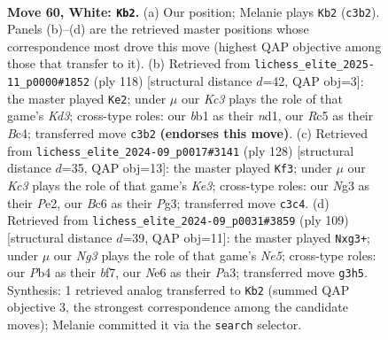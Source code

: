 \documentclass[11pt]{article}
\begin{document}
\clearpage

\begin{figure}[p]\centering
\begin{subfigure}{0.46\textwidth}\centering
\resizebox{\linewidth}{!}{%
\newchessgame
\chessboard[
  setfen={8/k3r3/2B1N3/2R2p2/1P6/2K3N1/6P1/1b6 w - - 16 60},
  showmover=false,
  pgfstyle=straightmove, color=movearrow, markmove={c3-b2}
]}
\caption{}
\end{subfigure}\hfill
\begin{subfigure}{0.46\textwidth}\centering
\resizebox{\linewidth}{!}{%
\newchessgame
\chessboard[
  setfen={8/4kp2/8/5p1R/2BP1P1P/3K1r2/8/3n4 w - - 0 60},
  showmover=false,
  pgfstyle=straightmove, color=movearrow, markmove={d3-e2}
]}
\caption{}
\end{subfigure}
\\[4pt]
\begin{subfigure}{0.46\textwidth}\centering
\resizebox{\linewidth}{!}{%
\newchessgame
\chessboard[
  setfen={8/6k1/2p1R2p/8/2r2N2/4K1P1/4P2P/1b6 w - - 28 65},
  showmover=false,
  pgfstyle=straightmove, color=movearrow, markmove={e3-f3}
]}
\caption{}
\end{subfigure}\hfill
\begin{subfigure}{0.46\textwidth}\centering
\resizebox{\linewidth}{!}{%
\newchessgame
\chessboard[
  setfen={8/5B2/8/4k3/R3n2P/p1r3P1/4K3/8 b - - 10 55},
  showmover=false,
  pgfstyle=straightmove, color=movearrow, markmove={e4-g3}
]}
\caption{}
\end{subfigure}
\caption{\textbf{Move 60, White: \texttt{Kb2}.} (a) Our position; Melanie plays \texttt{Kb2} (\texttt{c3b2}). Panels (b)--(d) are the retrieved master positions whose correspondence most drove this move (highest QAP objective among those that transfer to it). (b) Retrieved from \texttt{lichess\_elite\_2025-11\_p0000\#1852} (ply 118) [structural distance $d$=42, QAP obj=3]: the master played \texttt{Ke2}; under $\mu$ our \emph{Kc3} plays the role of that game's \emph{Kd3}; cross-type roles: our \emph{b}b1 as their \emph{n}d1, our \emph{R}c5 as their \emph{B}c4; transferred move \texttt{c3b2} \textbf{(endorses this move)}. (c) Retrieved from \texttt{lichess\_elite\_2024-09\_p0017\#3141} (ply 128) [structural distance $d$=35, QAP obj=13]: the master played \texttt{Kf3}; under $\mu$ our \emph{Kc3} plays the role of that game's \emph{Ke3}; cross-type roles: our \emph{N}g3 as their \emph{P}e2, our \emph{B}c6 as their \emph{P}g3; transferred move \texttt{c3c4}. (d) Retrieved from \texttt{lichess\_elite\_2024-09\_p0031\#3859} (ply 109) [structural distance $d$=39, QAP obj=11]: the master played \texttt{Nxg3+}; under $\mu$ our \emph{Ng3} plays the role of that game's \emph{Ne5}; cross-type roles: our \emph{P}b4 as their \emph{b}f7, our \emph{N}e6 as their \emph{P}a3; transferred move \texttt{g3h5}. Synthesis: 1 retrieved analog transferred to \texttt{Kb2} (summed QAP objective 3, the strongest correspondence among the candidate moves); Melanie committed it via the \texttt{search} selector.}
\label{fig:thought-m118}
\end{figure}
\end{document}
